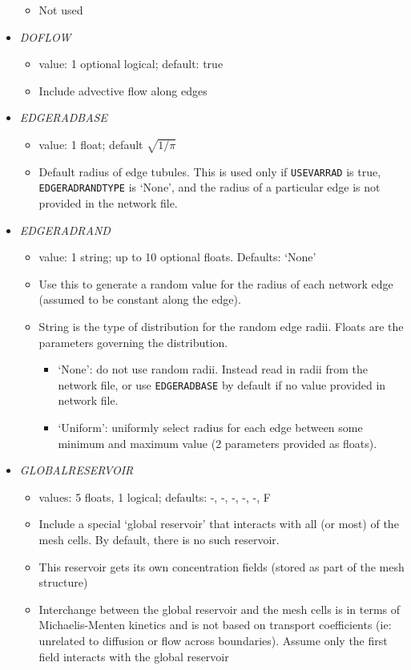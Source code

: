 \documentclass[12pt]{article}
\begin{document}
\begin{itemize}
\begin{itemize}
      \item Not used
    \end{itemize}
%
\item {\it DOFLOW}
\begin{itemize}
	\item  value: 1 optional logical; default: true 
	\item Include advective flow along edges
\end{itemize}
%
\item {\it EDGERADBASE}
\begin{itemize}
	\item  value: 1 float; default $\sqrt{1/\pi}$
	\item Default radius of edge tubules. This is used only if \verb=USEVARRAD= is true, \verb=EDGERADRANDTYPE= is `None', and the radius of a particular edge is not provided in the network file.
\end{itemize}
%
\item {\it EDGERADRAND}
\begin{itemize}
	\item  value: 1 string; up to 10 optional floats. Defaults: `None'
	\item Use this to generate a random value for the radius of each network edge (assumed to be constant along the edge). 
	\item String is the type of distribution for the random edge radii. Floats are the parameters governing the distribution.
	\begin{itemize}
		\item `None': do not use random radii. Instead read in radii from the network file, or use \verb=EDGERADBASE= by default if no value provided in network file.
		\item `Uniform': uniformly select radius for each edge between some minimum and maximum value (2 parameters provided as floats).
	\end{itemize}
\end{itemize}
%
\item {\it GLOBALRESERVOIR}
\begin{itemize}
	\item values: 5 floats, 1 logical; defaults: -, -, -, -, -, F
	\item Include a special `global reservoir' that interacts with all (or most) of the mesh cells. By default, there is no such reservoir.
	\item This reservoir gets its own concentration fields (stored as part of the mesh structure)
	\item Interchange between the global reservoir and the mesh cells is in terms of Michaelis-Menten kinetics and is not based on transport coefficients (ie: unrelated to diffusion or flow across boundaries). Assume only the first field interacts with the global reservoir

\end{itemize}
\end{itemize}
\end{document}
